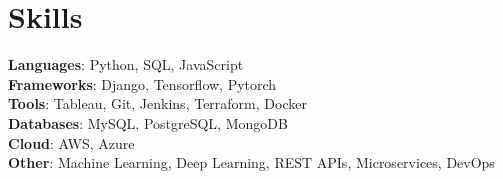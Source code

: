 \section{Skills}
  \begin{itemize}[leftmargin=0.1in, label={}]
    \normalsize{\item{
      \textbf{Languages}: Python, SQL, JavaScript \\
      \textbf{Frameworks}: Django, Tensorflow, Pytorch \\
      \textbf{Tools}: Tableau, Git, Jenkins, Terraform, Docker \\
      \textbf{Databases}: MySQL, PostgreSQL, MongoDB \\
      \textbf{Cloud}: AWS, Azure \\
      \textbf{Other}: Machine Learning, Deep Learning, REST APIs, Microservices, DevOps \\
     }}
  \end{itemize}
